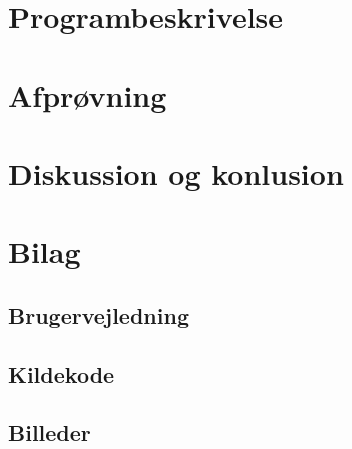 \documentclass[a4paper]{article}
\begin{document}
  \section{Programbeskrivelse} \label{sec:programDescription}
    
      
  \section{Afprøvning} \label{sec:unitTest}
    

	\section{Diskussion og konlusion} \label{sec:conclusion}
   
  \section{Bilag}
     
      \subsection{Brugervejledning} \label{ssec:manual}
        
      \subsection{Kildekode} \label{ssec:sourceCode}
        
        
        
        

      \subsection{Billeder}
        
\end{document}
